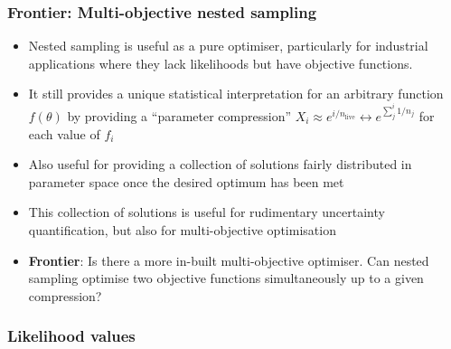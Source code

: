 \documentclass[aspectratio=169,handout]{beamer}
\begin{document}
\begin{frame}
    \frametitle{Frontier: Multi-objective nested sampling}
    \begin{itemize}
        \item Nested sampling is useful as a pure optimiser, particularly for industrial applications where they lack likelihoods but have objective functions.
        \item It still provides a unique statistical interpretation for an arbitrary function $f(\theta)$ by providing a ``parameter compression'' $X_i\approx e^{i/n_\mathrm{live}} \leftrightarrow e^{\sum_j^i{1}/{n_j}}$ for each value of $f_i$
        \item Also useful for providing a collection of solutions fairly distributed in parameter space once the desired optimum has been met
        \item This collection of solutions is useful for rudimentary uncertainty quantification, but also for multi-objective optimisation
        \item \textbf{Frontier}: Is there a more in-built multi-objective optimiser. Can nested sampling optimise two objective functions simultaneously up to a given compression?
    \end{itemize}
\end{frame}

\begin{frame}
    \frametitle{Likelihood values}
\end{frame}
\end{document}
